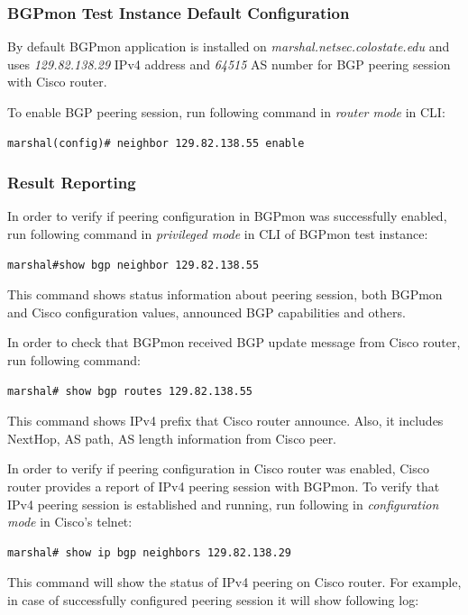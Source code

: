 \subsubsection{BGPmon Test Instance Default Configuration}
\label{sec:bgpmondef}

By default BGPmon application is installed on \emph{marshal.netsec.colostate.edu} and uses \emph{129.82.138.29} IPv4 address and \emph{64515} AS number for BGP peering session with Cisco router. 

To enable BGP peering session, run following command in \emph{router mode} in CLI:
\begin{verbatim}
marshal(config)# neighbor 129.82.138.55 enable
\end{verbatim}


\subsubsection{Result Reporting}

In order to verify if peering configuration in BGPmon was successfully enabled, run following command in \emph{privileged mode} in CLI of BGPmon test instance:
\begin{verbatim}
marshal#show bgp neighbor 129.82.138.55
\end{verbatim}

This command shows status information about peering session, both BGPmon and Cisco configuration values,  announced BGP capabilities and others.

In order to check that BGPmon received BGP update message from Cisco router, run following command:
\begin{verbatim}
marshal# show bgp routes 129.82.138.55
\end{verbatim}

This command shows IPv4 prefix that Cisco router announce. Also, it includes NextHop, AS path, AS length information from Cisco peer. 

In order to verify if peering configuration in Cisco router was enabled,  Cisco router provides a report of IPv4 peering session with BGPmon. To verify that IPv4 peering session is established and running,  run following in \emph{configuration mode} in Cisco's telnet:  

\begin{verbatim}
marshal# show ip bgp neighbors 129.82.138.29
\end{verbatim}

This command will show the status of IPv4 peering on Cisco router.  For example, in case of successfully configured peering session it will show following log:


